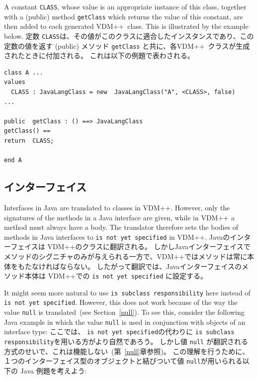 \documentclass[\pformat,12pt]{jarticle}
\newcommand{\VDM}{VDM++}
\begin{document}
A constant \texttt{CLASS}, whose value is an appropriate instance of
this class, together with a (public) method \texttt{getClass} which
returns the value of this constant, are then added to each generated
\VDM\ class. This is illustrated by the example below. 
定数 \texttt{CLASS}は、その値がこのクラスに適合したインスタンスであり、この定数の値を返す (public) メソッド \texttt{getClass} と共に、各\VDM\ クラスが生成されたときに付加される。
これは以下の例題で表わされる。

\begin{small}
\begin{verbatim}
class A ...
values 
  CLASS : JavaLangClass = new  JavaLangClass("A", <CLASS>, false)
...

public  getClass : () ==> JavaLangClass
getClass() == 
return  CLASS;

end A
\end{verbatim}
\end{small}

\subsection{インターフェイス}\label{interface}

Interfaces in Java are translated to classes in VDM++. However, only
the signatures of the methods in a Java interface are given, while in
VDM++ a method must always have a body. The translator therefore sets
the bodies of methods in Java interfaces to \texttt{is not yet
  specified} in VDM++. 
Javaのインターフェイスは VDM++のクラスに翻訳される。
しかしJavaインターフェイスでメソッドのシグニチャのみが与えられる一方で、VDM++ではメソッドは常に本体をもたなければならない。 
したがって翻訳では、Javaインターフェイスのメソッド本体は VDM++での \texttt{is not yet specified} に設定する。

It might seem more natural to use \texttt{is subclass responsibility}
  here instead of \texttt{is not yet specified}. However, this does
  not work because of the way the value \texttt{null} is
  translated~(see Section~\ref{null}). To see this, consider the
  following Java example in which the value \texttt{null} is used in
  conjunction with objects of an interface type:
ここでは、 \texttt{is not yet specified}の代わりに \texttt{is subclass responsibility}を用いる方がより自然であろう。
しかし値 \texttt{null} が翻訳される方式のせいで、これは機能しない~(第~\ref{null}章参照)。 
この理解を行うために、１つのインターフェイス型のオブジェクトと結びついて値 \texttt{null}が用いられる以下の Java 例題を考えよう:
\end{document}
